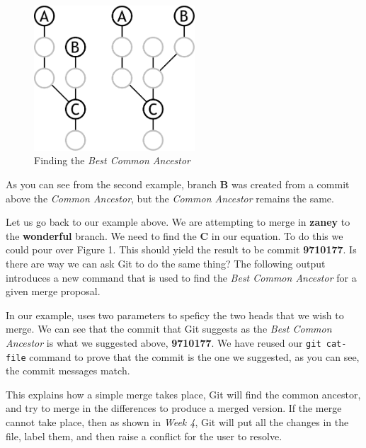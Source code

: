 \begin{figure}[hbt]
\centering
\includegraphics[width=6cm]{images/f-af4-d2.pdf}
\caption{Finding the \emph{Best Common Ancestor}}
\end{figure}

As you can see from the second example, branch \textbf{B} was created from a commit above the \emph{Common Ancestor}, but the \emph{Common Ancestor} remains the same.

Let us go back to our example above.
We are attempting to merge in \textbf{zaney} to the \textbf{wonderful} branch.
We need to find the \textbf{C} in our equation.
To do this we could pour over Figure 1.
This should yield the result to be commit \textbf{9710177}.
Is there are way we can ask Git to do the same thing? The following output introduces a new command that is used to find the \emph{Best Common Ancestor} for a given merge proposal.


In our example,  uses two parameters to speficy the two heads that we wish to merge.
We can see that the commit that Git suggests as the \emph{Best Common Ancestor} is what we suggested above, \textbf{9710177}.
We have reused our \texttt{git cat-file} command to prove that the commit is the one we suggested, as you can see, the commit messages match.

This explains how a simple merge takes place, Git will find the common ancestor, and try to merge in the differences to produce a merged version.
If the merge cannot take place, then as shown in \emph{Week 4}, Git will put all the changes in the file, label them, and then raise a conflict for the user to resolve.

